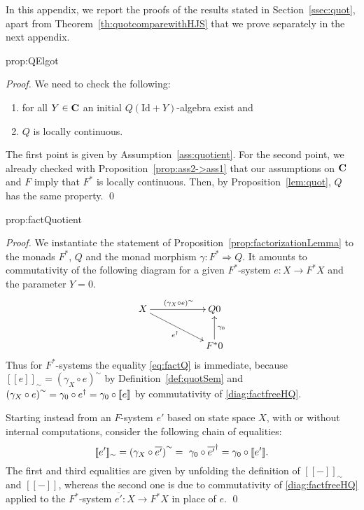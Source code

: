 \documentclass[oribibl,envcountsame,envcountsect,runningheads]{llncs}
\newcommand{\free}[1]{{#1^*}}
\renewcommand{\>}{\rangle}
\newcommand{\bb}[1]{[\![ #1 ]\!]}
\def\Id{\mathrm{Id}}
\def\quotsol#1{{#1}^{\sim}}
\newcommand{\bbq}[1]{\bb{#1}_{\sim}}
\def\To{\Rightarrow}
\def\GF{F} \def\GFG{G} \def\MM{R} \def\quot{\xi} \def\quotG{\gamma}
\newenvironment{proposition_for}[2][\empty]{\bigskip\noindent{\bf
    Proposition~\ref{#2}}\ifthenelse{\equal{#1}{\empty}}{{\bf.}}{ {\bf
      (#1).}}\it}{\vspace{0.5cm}}
\begin{document}
In this appendix, we report the proofs of the results stated in Section~\ref{ssec:quot}, apart from Theorem~\ref{th:quotcomparewithHJS} that we prove separately in the next appendix.


\begin{proposition_for}{prop:QElgot}
\propQElgot
\end{proposition_for}
\begin{proof} We need to check the following:
 \begin{enumerate}
   \item for all $Y \in \mathbf{C}$ an initial $Q(\Id+Y)$-algebra exist and
   \item $Q$ is locally continuous.
 \end{enumerate}
 The first point is given by Assumption~\ref{ass:quotient}. For the second point, we already checked with Proposition~\ref{prop:ass2->ass1} that our assumptions on $\mathbf{C}$ and $\GF $ imply that $\free{\GF }$ is locally continuous. Then, by Proposition~\ref{lem:quot}, $Q$ has the same property. \qed
\end{proof}



\begin{proposition_for}{prop:factQuotient}
\propfactQuotient
\end{proposition_for}
\begin{proof} We instantiate the statement of Proposition~\ref{prop:factorizationLemma} to the monads $\free{\GF }$, $Q$ and the monad morphism $\quotG \colon \free{\GF } \To Q$. It amounts to commutativity of the following diagram for a given $\free{\GF }$-system $e \colon X \to \free{\GF }X$ and the parameter $Y = 0$.
\begin{equation}\label{diag:factfreeHQ}
\xymatrix{
    X \ar[rr]^{\quotsol {(\quotG_X \circ e)}} \ar[drr]_{\cansol e} && Q0 \\
    && \free{\GF }0 \ar[u]_{\quotG_0}
}
\end{equation}
Thus for $\free{\GF }$-systems the equality \eqref{eq:factQ} is immediate, because $\bbq{e} = \quotsol {(\quotG_X \circ e)}$ by Definition~\ref{def:quotSem} and $\quotsol {(\quotG_X \circ e)} = \quotG_0 \circ \cansol e = \quotG_0 \circ \bb{e}$ by commutativity of \eqref{diag:factfreeHQ}.

Starting instead from an $\GF $-system $e'$ based on state space $X$, with or without internal computations, consider the following chain of equalities:
\[ \bbq{e'} = \quotsol {(\quotG_X \circ \overline{e'})}  =\ \quotG_0 \circ \cansol{\overline{e'}} = \quotG_0 \circ \bb{e'}. \]
The first and third equalities are given by unfolding the definition of $\bbq{-}$ and $\bb{-}$, whereas the second one is due to commutativity of \eqref{diag:factfreeHQ} applied to the $\free{\GF }$-system $\overline{e'} \colon X \to \free{\GF }X$ in place of $e$. \qed
\end{proof}
\end{document}
